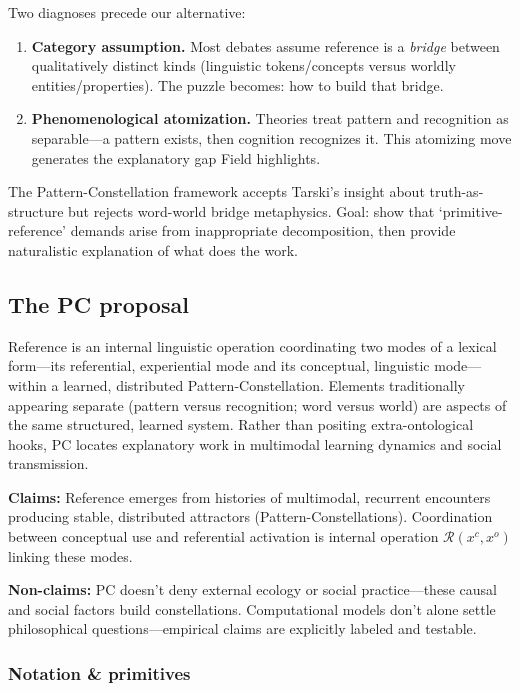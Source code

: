 \documentclass[12pt]{article}
\begin{document}
Two diagnoses precede our alternative:

\begin{enumerate}
\def\labelenumi{\arabic{enumi}.}
\item
  \textbf{Category assumption.} Most debates assume reference is a \emph{bridge} between qualitatively distinct kinds (linguistic tokens/concepts versus worldly entities/properties). The puzzle becomes: how to build that bridge.
\item
  \textbf{Phenomenological atomization.} Theories treat pattern and recognition as separable---a pattern exists, then cognition recognizes it. This atomizing move generates the explanatory gap Field highlights.
\end{enumerate}

The Pattern-Constellation framework accepts Tarski's insight about truth-as-structure but rejects word-world bridge metaphysics. Goal: show that `primitive-reference' demands arise from inappropriate decomposition, then provide naturalistic explanation of what does the work.

\subsection{The PC proposal}\label{the-pc-proposal}

Reference is an internal linguistic operation coordinating two modes of a lexical form---its referential, experiential mode and its conceptual, linguistic mode---within a learned, distributed Pattern-Constellation. Elements traditionally appearing separate (pattern versus recognition; word versus world) are aspects of the same structured, learned system. Rather than positing extra-ontological hooks, PC locates explanatory work in multimodal learning dynamics and social transmission.

\textbf{Claims:} Reference emerges from histories of multimodal, recurrent encounters producing stable, distributed attractors (Pattern-Constellations). Coordination between conceptual use and referential activation is internal operation \(\mathcal{R}(x^c, x^o)\) linking these modes.

\textbf{Non-claims:} PC doesn't deny external ecology or social practice---these causal and social factors build constellations. Computational models don't alone settle philosophical questions---empirical claims are explicitly labeled and testable.

\subsubsection{Notation \& primitives}\label{notation-primitives}
\end{document}
